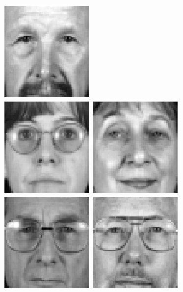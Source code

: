 \begin{figure}[ht]
\begin{center}
\includegraphics[scale=0.12]{ch4/figures/XM2VTS_56.png}\\
\includegraphics[scale=0.12]{ch4/figures/XM2VTS_57.png}
\includegraphics[scale=0.12]{ch4/figures/XM2VTS_58.png}
\includegraphics[scale=0.12]{ch4/figures/XM2VTS_59.png}
\includegraphics[scale=0.12]{ch4/figures/XM2VTS_60.png}

\end{center}
\end{figure}
